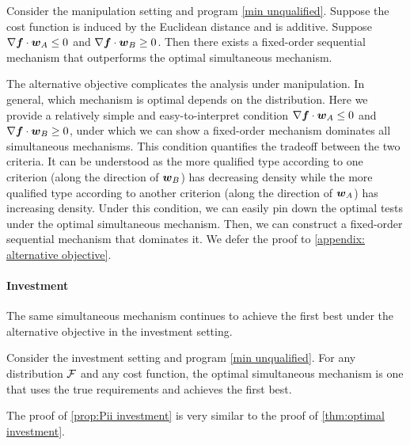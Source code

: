 \begin{proposition}\label{prop:Pii manipulation}
    Consider the manipulation setting and program \ref{min unqualified}.
    Suppose the cost function is induced by the Euclidean distance and is additive.
    Suppose $\nabla \boldsymbol{f} \cdot \boldsymbol{w}_A \leq 0$ and $\nabla \boldsymbol{f} \cdot \boldsymbol{w}_B \geq 0$.
    Then there exists a fixed-order sequential mechanism that outperforms the optimal simultaneous mechanism.
\end{proposition}


The alternative objective complicates the analysis under manipulation.
In general, which mechanism is optimal depends on the distribution.
Here we provide a relatively simple and easy-to-interpret condition $\nabla \boldsymbol{f} \cdot \boldsymbol{w}_A \leq 0$ and $\nabla \boldsymbol{f} \cdot \boldsymbol{w}_B \geq 0$, under which we can show a fixed-order mechanism dominates all simultaneous mechanisms. 
This condition quantifies the tradeoff between the two criteria.
It can be understood as the more qualified type according to one criterion (along 
the direction of $\boldsymbol{w}_B$) has decreasing density while the more qualified type according to another criterion (along 
the direction of $\boldsymbol{w}_A$) has increasing density. 
Under this condition, we can easily pin down the optimal tests under the optimal simultaneous mechanism.
Then, we can construct a fixed-order sequential mechanism that dominates it.
We defer the proof to \cref{appendix: alternative objective}. 



\paragraph{Investment} The same simultaneous mechanism continues to achieve the first best under the alternative objective in the investment setting. 
\begin{proposition}\label{prop:Pii investment}
    Consider  the investment setting and program \ref{min unqualified}.
    For any distribution $\mathcal{F}$ and any cost function, the optimal  simultaneous mechanism is one that uses the true requirements and  achieves the first best.
\end{proposition}

The proof of \cref{prop:Pii investment} is very similar to the proof of \cref{thm:optimal investment}.
